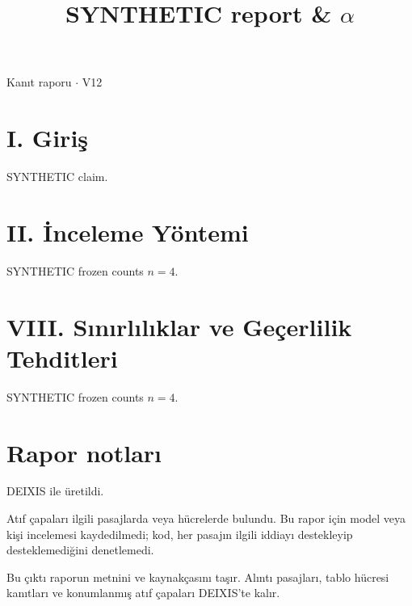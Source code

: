 \documentclass[journal]{IEEEtran}
\begin{document}
\renewcommand{\abstractname}{Özet}
\renewcommand{\IEEEkeywordsname}{Dizin Terimleri}
\renewcommand{\refname}{Kaynaklar}

\title{SYNTHETIC report \& \ensuremath{\alpha}}

\maketitle

\noindent Kanıt raporu \ensuremath{\cdot} V12

\section*{I. Giriş}

SYNTHETIC claim. \cite{Synth26}

\section*{II. İnceleme Yöntemi}

SYNTHETIC frozen counts $n=4$.

\section*{VIII. Sınırlılıklar ve Geçerlilik Tehditleri}

SYNTHETIC frozen counts $n=4$.

\section*{Rapor notları}

DEIXIS ile üretildi.

Atıf çapaları ilgili pasajlarda veya hücrelerde bulundu. Bu rapor için model veya kişi incelemesi kaydedilmedi; kod, her pasajın ilgili iddiayı destekleyip desteklemediğini denetlemedi.

Bu çıktı raporun metnini ve kaynakçasını taşır. Alıntı pasajları, tablo hücresi kanıtları ve konumlanmış atıf çapaları DEIXIS'te kalır.




\end{document}
